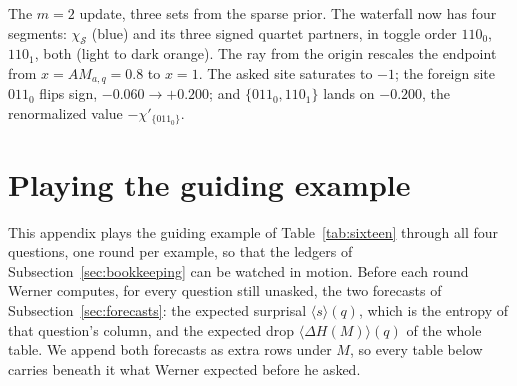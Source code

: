 \documentclass[11pt]{article}
\let\stdsection\section
\renewcommand{\section}{\clearpage\stdsection}
\begin{document}
\begin{example}
\begin{center}
\end{center}
The $m = 2$ update, three sets from the sparse
prior. The waterfall now has four segments: $\chi_{\mathcal S}$ (blue) and
its three signed quartet partners, in toggle order $110_0$,
$110_1$, both (light to dark orange). The ray from the origin
rescales the endpoint from $x = A M_{a,q} = 0.8$ to $x = 1$.
The asked site saturates to $-1$; the foreign site $011_0$ flips
sign, $-0.060 \to +0.200$; and $\{011_0, 110_1\}$ lands on
$-0.200$, the renormalized value $-\chi'_{\{011_0\}}$.
\end{example}


\section{Playing the guiding example}\label{app:playing}

This appendix plays the guiding example of Table~\ref{tab:sixteen}
through all four questions, one round per example, so that the ledgers
of Subsection~\ref{sec:bookkeeping} can be watched in motion. Before
each round Werner computes, for every question still unasked, the two
forecasts of Subsection~\ref{sec:forecasts}: the expected surprisal
$\langle s \rangle(q)$, which is the entropy of that question's
column, and the expected drop $\langle \Delta H(M) \rangle(q)$ of the
whole table. We append both forecasts as extra rows under $M$, so every
table below carries beneath it what Werner expected before he asked.
\end{document}
